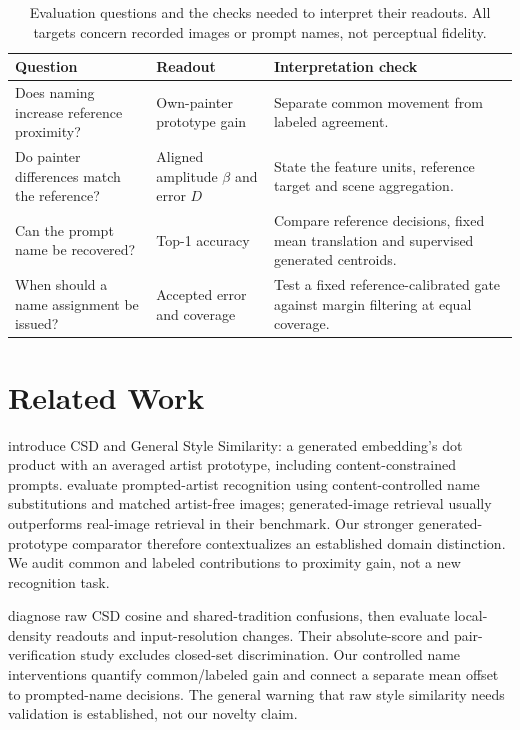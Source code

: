 \begin{table}[t]
\caption{Evaluation questions and the checks needed to interpret their readouts.
All targets concern recorded images or prompt names, not perceptual fidelity.}
\label{tab:quantity-map}
\centering\small
\begin{tabularx}{\linewidth}{@{}p{.25\linewidth}p{.25\linewidth}X@{}}
\toprule
Question & Readout & Interpretation check\\\midrule
Does naming increase reference proximity? & Own-painter prototype gain & Separate common movement from labeled agreement.\\
Do painter differences match the reference? & Aligned amplitude $\beta$ and error $D$ & State the feature units, reference target and scene aggregation.\\
Can the prompt name be recovered? & Top-1 accuracy & Compare reference decisions, fixed mean translation and supervised generated centroids.\\
When should a name assignment be issued? & Accepted error and coverage & Test a fixed reference-calibrated gate against margin filtering at equal coverage.\\
\bottomrule
\end{tabularx}
\end{table}


\section{Related Work}
\citet{somepalli2024style} introduce CSD and General Style Similarity: a generated
embedding's dot product with an averaged artist prototype, including
content-constrained prompts. \citet{su2025prompted} evaluate prompted-artist
recognition using content-controlled name substitutions and matched artist-free
images; generated-image retrieval usually outperforms real-image retrieval in
their benchmark. Our stronger generated-prototype comparator therefore
contextualizes an established domain distinction. We audit common and labeled
contributions to proximity gain, not a new recognition task.

\citet{frochte2026csd} diagnose raw CSD cosine and shared-tradition confusions,
then evaluate local-density readouts and input-resolution changes. Their
absolute-score and pair-verification study excludes closed-set discrimination.
Our controlled name interventions quantify common/labeled gain and connect a
separate mean offset to prompted-name decisions. The general warning that raw
style similarity needs validation is established, not our novelty claim.

